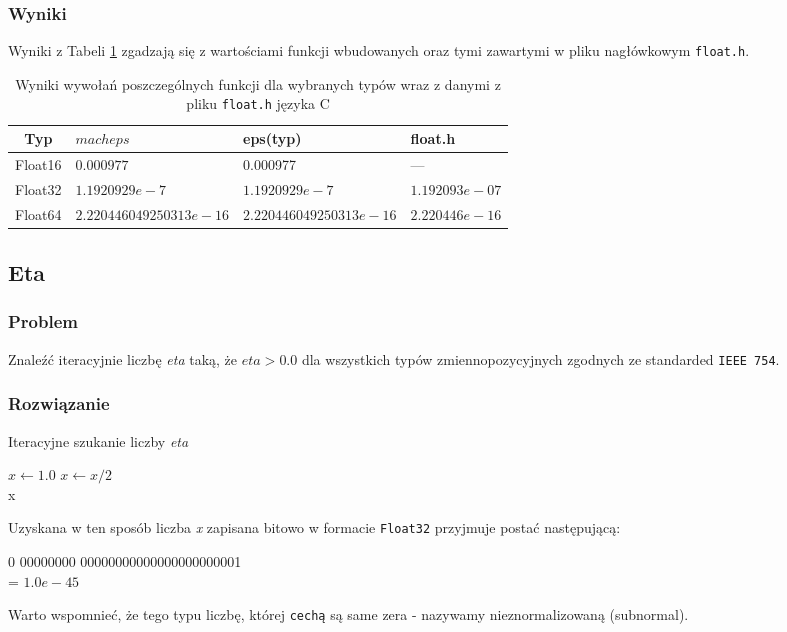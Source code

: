 \documentclass{article}
\begin{document}
        \subsubsection{Wyniki}
        Wyniki z Tabeli \ref{table:macheps} zgadzają się z wartościami funkcji wbudowanych oraz tymi zawartymi w pliku nagłówkowym \texttt{float.h}.
        {\small
        \begin{table}[h!]
        \begin{tabularx}{\textwidth}{c X X X}
            \hline
             Typ & $macheps$ & eps(typ) & float.h \\
             \hline
             Float16 & $0.000977$ & 0.000977 & --- \\
             Float32 & $1.1920929e-7$ & $1.1920929e-7$ & $1.192093e-07$ \\
             Float64 & $2.220446049250313e-16$ & $2.220446049250313e-16$ & $2.220446e-16$ \\
             \hline
        \end{tabularx}
        \caption{Wyniki wywołań poszczególnych funkcji dla wybranych typów wraz z danymi z pliku \texttt{float.h} języka C}
        \label{table:macheps}
        \end{table}
        }
    
    \subsection{Eta}
    \subsubsection{Problem}
        Znaleźć iteracyjnie liczbę \textit{eta} taką, że $eta > 0.0$ dla wszystkich typów zmiennopozycyjnych zgodnych ze standarded \texttt{IEEE 754}.
        \subsubsection{Rozwiązanie}
        \begin{algorithm}
        \caption{Iteracyjne szukanie liczby \textit{eta}}
        \begin{algorithmic}[1]
        \State $x\gets 1.0$
            \State $x\gets x / 2$
        \EndWhile \\
        \Return x
        \end{algorithmic}
        \end{algorithm}
        Uzyskana w ten sposób liczba \textit{x} zapisana bitowo w formacie \texttt{Float32} przyjmuje postać następującą:
        \begin{center}
            0 00000000 00000000000000000000001 \\
            = $1.0e-45$
        \end{center}
        Warto wspomnieć, że tego typu liczbę, której \texttt{cechą} są same zera - nazywamy nieznormalizowaną (subnormal).
\end{document}
